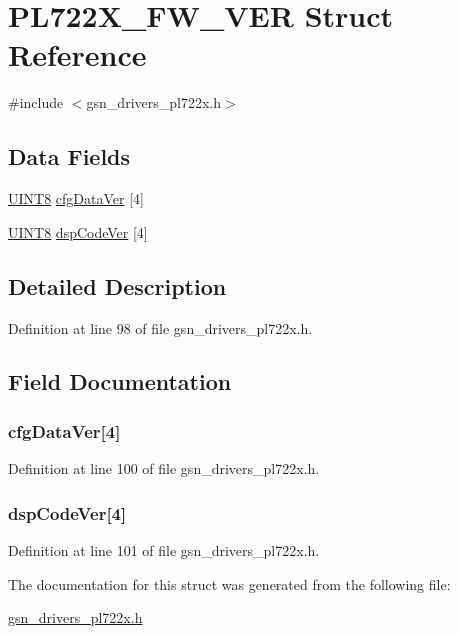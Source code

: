 \hypertarget{a00451}{
\section{PL722X\_\-FW\_\-VER Struct Reference}
\label{a00451}
}


{\ttfamily \#include $<$gsn\_\-drivers\_\-pl722x.h$>$}

\subsection*{Data Fields}
\begin{DoxyCompactItemize}
\item 
\hyperlink{a00660_gab27e9918b538ce9d8ca692479b375b6a}{UINT8} \hyperlink{a00451_aa74fe51631c906bc1f5c3f0573e50add}{cfgDataVer} \mbox{[}4\mbox{]}
\item 
\hyperlink{a00660_gab27e9918b538ce9d8ca692479b375b6a}{UINT8} \hyperlink{a00451_a7328866fd1f9a2b6cc229975234f542a}{dspCodeVer} \mbox{[}4\mbox{]}
\end{DoxyCompactItemize}


\subsection{Detailed Description}


Definition at line 98 of file gsn\_\-drivers\_\-pl722x.h.



\subsection{Field Documentation}
\hypertarget{a00451_aa74fe51631c906bc1f5c3f0573e50add}{
\subsubsection[{cfgDataVer}]{ {\bf cfgDataVer}\mbox{[}4\mbox{]}}}
\label{a00451_aa74fe51631c906bc1f5c3f0573e50add}


Definition at line 100 of file gsn\_\-drivers\_\-pl722x.h.

\hypertarget{a00451_a7328866fd1f9a2b6cc229975234f542a}{
\subsubsection[{dspCodeVer}]{ {\bf dspCodeVer}\mbox{[}4\mbox{]}}}
\label{a00451_a7328866fd1f9a2b6cc229975234f542a}


Definition at line 101 of file gsn\_\-drivers\_\-pl722x.h.



The documentation for this struct was generated from the following file:\begin{DoxyCompactItemize}
\item 
\hyperlink{a00486}{gsn\_\-drivers\_\-pl722x.h}\end{DoxyCompactItemize}
